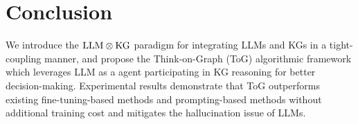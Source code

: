 \documentclass{article} %
\begin{document}


\section{Conclusion}
We introduce the $\hbox{LLM}\otimes \hbox{KG}$ paradigm for integrating LLMs and KGs in a tight-coupling manner, and propose the Think-on-Graph (ToG) algorithmic framework which leverages LLM as a agent participating in KG reasoning for better decision-making. Experimental results demonstrate that ToG outperforms existing fine-tuning-based methods and prompting-based methods without additional training cost and mitigates the hallucination issue of LLMs.
\end{document}

